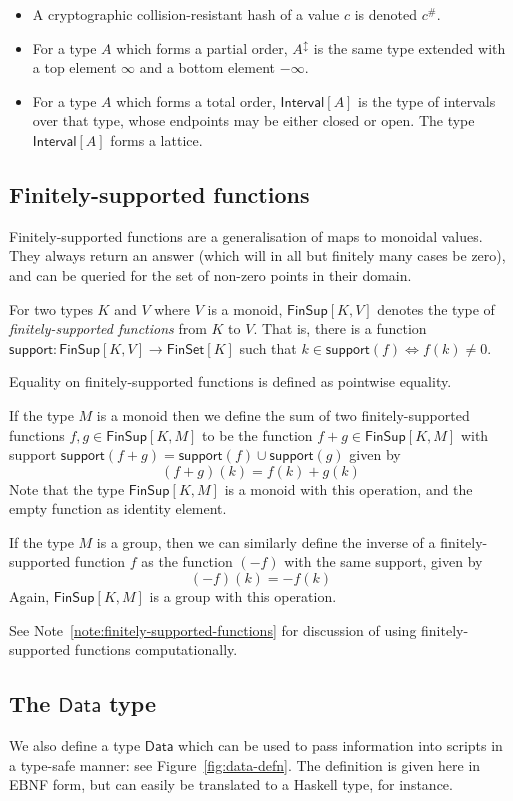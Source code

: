 \documentclass[a4paper]{article}
\newcounter{note}
\newcommand{\s}{\textsf}  %
\newcommand{\msf}[1]{\ensuremath{\mathsf{#1}}}
\newcommand{\hash}[1]{\ensuremath{#1^{\#}}}
\newcommand{\FinSet}[1]{\ensuremath{\s{FinSet}[#1]}}
\newcommand{\Interval}[1]{\ensuremath{\s{Interval}[#1]}}
\newcommand{\extended}[1]{#1^\updownarrow}
\newcommand{\FinSup}[2]{\ensuremath{\s{FinSup}[#1,#2]}}
\newcommand{\support}{\msf{support}}
\newcommand{\Data}{\ensuremath{\s{Data}}}
\begin{document}
\begin{itemize}
\item A cryptographic collision-resistant hash of a value $c$ is denoted $\hash{c}$.

\item For a type $A$ which forms a partial order, $\extended{A}$ is the same
  type extended with a top element $\infty$ and a bottom element $-\infty$.

\item For a type $A$ which forms a total order,  $\Interval{A}$ is the type
  of intervals over that type, whose endpoints may be either closed or open.
  The type $\Interval{A}$ forms a lattice.
\end{itemize}

\subsection {Finitely-supported functions}
\label{sec:fsfs}

Finitely-supported functions are a generalisation of maps to monoidal values.
They always return an answer (which will in all but finitely many cases be
zero), and can be queried for the set of non-zero points in their domain.

For two types $K$ and $V$ where $V$ is a monoid, $\FinSup{K}{V}$ denotes the type of
\textit{finitely-supported functions} from $K$ to $V$. That is, there is a
function $\support : \FinSup{K}{V} \rightarrow \FinSet{K}$ such that
$k \in \support(f) \Leftrightarrow f(k) \neq 0$.

Equality on finitely-supported functions is defined as pointwise equality.

If the type $M$ is a monoid then we define the sum of two finitely-supported
functions
$f, g \in \FinSup{K}{M}$ to be the function $f+g \in \FinSup{K}{M}$ with
support $\support (f+g) = \support(f) \cup \support(g)$ given by
\[(f+g)(k) = f(k) + g(k) \]
Note that the type $\FinSup{K}{M}$ is a monoid with this
operation, and the empty function as
identity element.

If the type $M$ is a group, then we can
similarly define the inverse of a finitely-supported function $f$ as
the function $(-f)$ with the same support, given by
\[ (-f)(k) = -f(k) \]
Again, $\FinSup{K}{M}$ is a group with this operation.

See Note~\ref{note:finitely-supported-functions} for discussion of using
finitely-supported functions computationally.

\subsection{The \Data{} type}
We also define a type \Data{} which can be used to pass information
into scripts in a type-safe manner: see Figure~\ref{fig:data-defn}. The
definition is given here in EBNF form, but can easily be translated to
a Haskell type, for instance.
\end{document}
